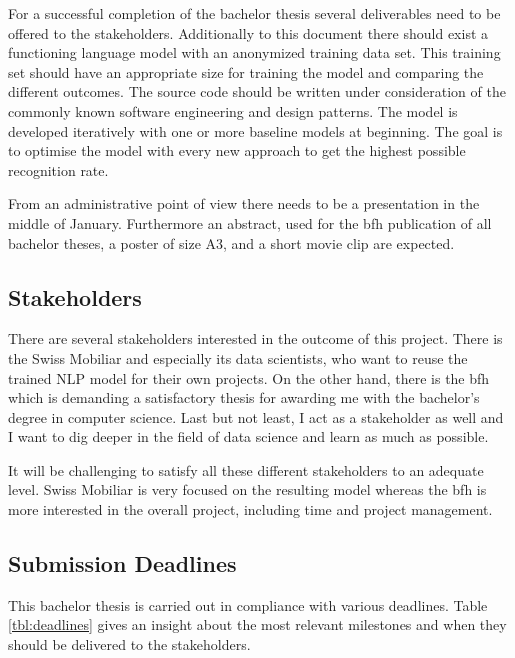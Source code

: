 For a successful completion of the bachelor thesis several deliverables need to be offered to the stakeholders. Additionally
to this document there should exist a functioning language model with an anonymized training data set. This training set
should have an appropriate size for training the model and comparing the different outcomes. The source code should be
written under consideration of the commonly known software engineering and design patterns. The model is developed
iteratively with one or more baseline models at beginning. The goal is to optimise the model with every new approach to
get the highest possible recognition rate.

From an administrative point of view there needs to be a presentation in the middle of January. Furthermore an abstract, used
for the \acrshort{bfh} publication of all bachelor theses, a poster of size A3, and a short movie clip are expected.

\subsection{Stakeholders}

There are several stakeholders interested in the outcome of this project. There is the Swiss Mobiliar and especially its data
scientists, who want to reuse the trained NLP model for their own projects. On the other hand, there is the \acrlong{bfh} which
is demanding a satisfactory thesis for awarding me with the bachelor's degree in computer science. Last but not least, I act as
a stakeholder as well and I want to dig deeper in the field of data science and learn as much as possible.

It will be challenging to satisfy all these different stakeholders to an adequate level. Swiss Mobiliar is very focused on the
resulting model whereas the \acrshort{bfh} is more interested in the overall project, including time and project management.

\subsection{Submission Deadlines}

This bachelor thesis is carried out in compliance with various deadlines. Table \ref{tbl:deadlines} gives an insight about the most
relevant milestones and when they should be delivered to the stakeholders.

